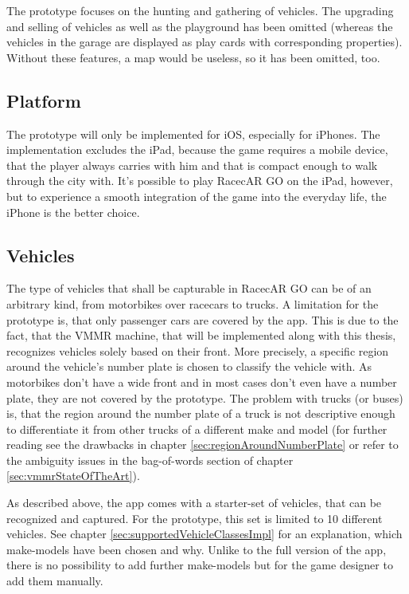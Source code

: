 The prototype focuses on the hunting and gathering of vehicles. The upgrading and selling of vehicles as well as the playground has been omitted (whereas the vehicles in the garage are displayed as play cards with corresponding properties). Without these features, a map would be useless, so it has been omitted, too.

\subsection{Platform}
The prototype will only be implemented for iOS, especially for iPhones. The implementation excludes the iPad, because the game requires a mobile device, that the player always carries with him and that is compact enough to walk through the city with. It's possible to play RacecAR GO on the iPad, however, but to experience a smooth integration of the game into the everyday life, the iPhone is the better choice.

\subsection{Vehicles}
The type of vehicles that shall be capturable in RacecAR GO can be of an arbitrary kind, from motorbikes over racecars to trucks. A limitation for the prototype is, that only passenger cars are covered by the app. This is due to the fact, that the VMMR machine, that will be implemented along with this thesis, recognizes vehicles solely based on their front. More precisely, a specific region around the vehicle's number plate is chosen to classify the vehicle with. As motorbikes don't have a wide front and in most cases don't even have a number plate, they are not covered by the prototype. The problem with trucks (or buses) is, that the region around the number plate of a truck is not descriptive enough to differentiate it from other trucks of a different make and model (for further reading see the drawbacks in chapter \ref{sec:regionAroundNumberPlate} or refer to the ambiguity issues in the bag-of-words section of chapter \ref{sec:vmmrStateOfTheArt}).

As described above, the app comes with a starter-set of vehicles, that can be recognized and captured. For the prototype, this set is limited to 10 different vehicles. See chapter \ref{sec:supportedVehicleClassesImpl} for an explanation, which make-models have been chosen and why. Unlike to the full version of the app, there is no possibility to add further make-models but for the game designer to add them manually.

